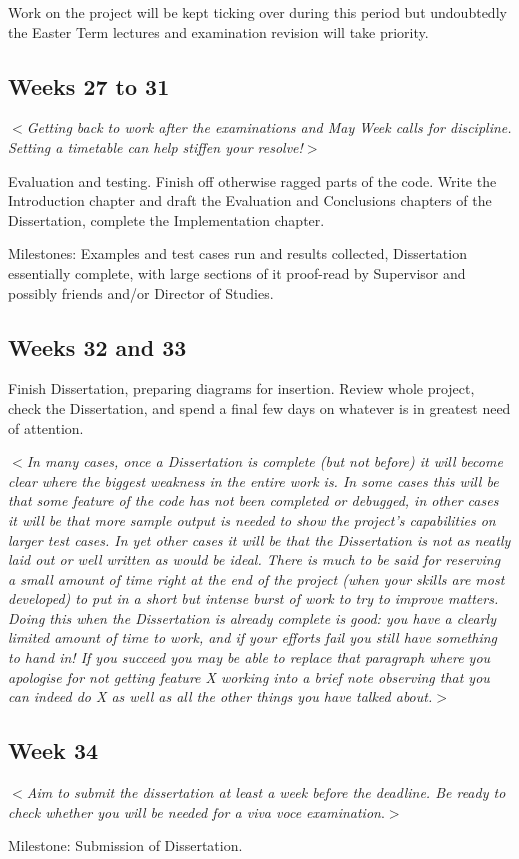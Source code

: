 \documentclass[12pt]{article}
\newcommand{\al}{$<$}
\newcommand{\ar}{$>$}
\begin{document}
Work on the project will be kept ticking over during this period but
undoubtedly the Easter Term lectures and examination revision will
take priority.


\subsection*{Weeks 27 to 31}

\al\emph{Getting back to work after the examinations and May Week
  calls for discipline.  Setting a timetable can help stiffen your
  resolve!}\ar

Evaluation and testing.  Finish off otherwise ragged parts of the
code.  Write the Introduction chapter and draft the Evaluation and
Conclusions chapters of the Dissertation, complete the Implementation
chapter.

Milestones: Examples and test cases run and results collected,
Dissertation essentially complete, with large sections of it
proof-read by Supervisor and possibly friends and/or Director of
Studies.


\subsection*{Weeks 32 and 33}

Finish Dissertation, preparing diagrams for insertion.  Review whole
project, check the Dissertation, and spend a final few days on
whatever is in greatest need of attention.

\al\emph{In many cases, once a Dissertation is complete (but not
  before) it will become clear where the biggest weakness in the
  entire work is.  In some cases this will be that some feature of the
  code has not been completed or debugged, in other cases it will be
  that more sample output is needed to show the project's capabilities
  on larger test cases.  In yet other cases it will be that the
  Dissertation is not as neatly laid out or well written as would be
  ideal.  There is much to be said for reserving a small amount of
  time right at the end of the project (when your skills are most
  developed) to put in a short but intense burst of work to try to
  improve matters.  Doing this when the Dissertation is already
  complete is good: you have a clearly limited amount of time to work,
  and if your efforts fail you still have something to hand in!  If
  you succeed you may be able to replace that paragraph where you
  apologise for not getting feature X working into a brief note
  observing that you can indeed do X as well as all the other things
  you have talked about.}\ar


\subsection*{Week 34}

\al\emph{Aim to submit the dissertation at least a week before the
  deadline. Be ready to check whether you will be needed for a\/ {\rm
    viva voce} examination}.\ar

Milestone: Submission of Dissertation. 
\end{document}
